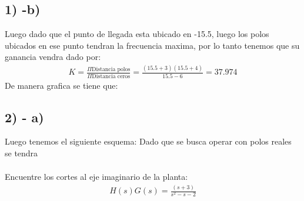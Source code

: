 \documentclass[
  11pt,
  letterpaper,
   addpoints,
   answers
  ]{exam}
\begin{document}
\begin{questions}
\begin{solution}
\subsection*{1) -b)}
Luego dado que el punto de llegada esta ubicado en -15.5, luego los polos ubicados en ese punto tendran la frecuencia maxima, por lo tanto tenemos que su ganancia vendra dado por:
\begin{align}
    K= \frac{\Pi \text{Distancia polos}}{\Pi \text{Distancia ceros}} = \frac{(15.5+3)(15.5+4)}{15.5-6} = 37.974
\end{align}
De manera grafica se tiene que:
\subsection*{2) - a)}
Luego tenemos el siguiente esquema:
Dado que se busca operar con polos reales se tendra 
\begin{align}
    
\end{align}
\end{solution}
\question Encuentre los cortes al eje imaginario de la planta:
\begin{align}
    H(s)G(s) = \frac{(s+3)}{s^{2}-s-2}
\end{align}
\begin{solution}

\end{solution}
\end{questions}
\end{document}
